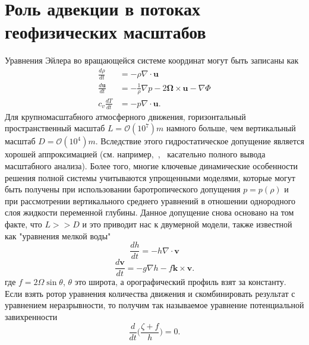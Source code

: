 \chapter{Роль адвекции в потоках геофизических масштабов} \label{chapt_3}
Уравнения Эйлера во вращающейся системе координат могут быть записаны как
%
\begin{align}
\label{eq:equation3_1}
\frac{d\rho}{dt}&=-\rho\nabla\cdot\mathbf{u}\\
\label{eq:equation3_2}
\frac{d\mathbf{u}}{dt}&=-\frac{1}{\rho}\nabla p - 2 \mathbf{\Omega} \times \mathbf{u} - \nabla \Phi\\
\label{eq:equation3_3}
c_v\frac{dT}{dt}&=-p\nabla\cdot\mathbf{u}.
\end{align}
%
Для крупномасштабного атмосферного движения, горизонтальный пространственный масштаб $L=\mathcal{O}(10^7)m$ намного больше, чем вертикальный масштаб $D=\mathcal{O}(10^4)m$. Вследствие этого гидростатическое допущение является хорошей аппроксимацией (см. например,~\cite{A24},~\cite{A49} касательно полного вывода масштабного анализа). Более того, многие ключевые динамические особенности решения полной системы учитываются упрощенными моделями, которые могут быть получены при использовании баротропического допущения $p=p(\rho)$ и при  рассмотрении вертикального среднего уравнений в отношении однородного слоя жидкости переменной глубины. Данное допущение снова основано на том факте, что $L >> D$ и это приводит нас к двумерной модели, также известной как "уравнения мелкой воды"
%
\begin{equation}
\label{eq:equation3_4}
\frac{dh}{dt}=-h\nabla \cdot \mathbf{v}
\end{equation}
%
%
\begin{equation}
\label{eq:equation3_5}
\frac{d\mathbf{v}}{dt}=-g\nabla h - f\mathbf{k}\times \mathbf{v}.
\end{equation}
%
где $f=2\Omega\sin\theta$, $\theta$ это широта, а орографический профиль взят за константу. Если взять ротор уравнения количества движения и скомбинировать результат с уравнением неразрывности, то получим так называемое уравнение потенциальной завихренности
%
\begin{equation}
\label{eq:equation3_6}
\frac{d}{dt}\Big(\frac{\zeta + f}{h}\Big) = 0.
\end{equation}
%
